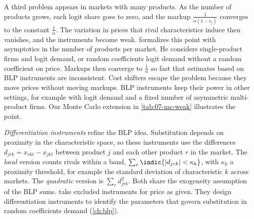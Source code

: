 A third problem appears in markets with many products. As the number of products grows, each logit share goes to
zero, and the markup $\frac{1}{\alpha(1 - s_j)}$ converges to the constant $\frac{1}{\alpha}$. The variation in prices
that rival characteristics induce then vanishes, and the instruments become weak. \citet{Armstrong2016} formalizes
this point with asymptotics in the number of products per market. He considers single-product firms and logit
demand, or random coefficients logit demand without a random coefficient on price. Markups then converge to
$\frac{1}{\alpha}$ so fast that estimates based on BLP instruments are inconsistent. Cost shifters escape the problem
because they move prices without moving markups. BLP instruments keep their power in other settings, for example
with logit demand and a fixed number of asymmetric multi-product firms.
Our Monte Carlo extension in \cref{tab:07-mc-weak} illustrates the point.

\emph{Differentiation instruments} \citep[Section~2.3]{GandhiHoude2019} refine the BLP idea.
Substitution depends on proximity in the characteristic space, so these instruments use the differences $d_{jrk} =
x_{rkt} - x_{jkt}$ between product $j$ and each other product $r$ in the market. The \emph{local} version counts rivals within a band,
$\sum_r \indic\{|d_{jrk}| < \kappa_k\}$, with $\kappa_k$ a proximity threshold, for example the standard deviation of
characteristic $k$ across markets. The \emph{quadratic} version is $\sum_r d_{jrk}^2$. Both share the exogeneity
assumption of the BLP sums. \citet[p.~7]{GandhiHoude2019} take excluded instruments for price as given. They design
differentiation instruments to identify the parameters that govern substitution in random coefficients demand
(\cref{ch:blp}).

